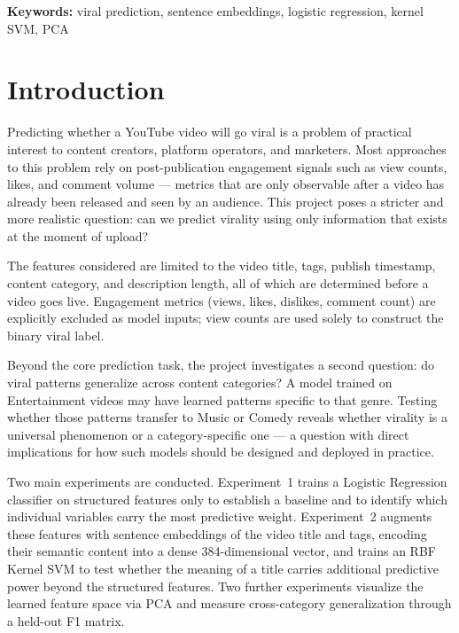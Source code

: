 \documentclass[12pt,a4paper]{article}
\begin{document}
\noindent\textbf{Keywords:} viral prediction, sentence embeddings, logistic regression, kernel SVM, PCA

\vspace{1em}
\newpage
\tableofcontents
\newpage

\section{Introduction}

Predicting whether a YouTube video will go viral is a problem of practical
interest to content creators, platform operators, and marketers.  Most
approaches to this problem rely on post-publication engagement signals such as
view counts, likes, and comment volume --- metrics that are only observable
after a video has already been released and seen by an audience.  This project
poses a stricter and more realistic question: can we predict virality
using only information that exists at the moment of upload?

The features considered are limited to the video title, tags, publish
timestamp, content category, and description length, all of which are
determined before a video goes live.  Engagement metrics (views, likes,
dislikes, comment count) are explicitly excluded as model inputs; view counts
are used solely to construct the binary viral label.

Beyond the core prediction task, the project investigates a second question:
do viral patterns generalize across content categories?  A model
trained on Entertainment videos may have learned patterns specific to that genre.
Testing whether those patterns transfer to Music or Comedy reveals
whether virality is a universal phenomenon or a category-specific one --- a
question with direct implications for how such models should be designed and
deployed in practice.

Two main experiments are conducted.  Experiment~1 trains a Logistic Regression
classifier on structured features only to establish a baseline and to identify
which individual variables carry the most predictive weight.  Experiment~2
augments these features with sentence embeddings of the video title and tags,
encoding their semantic content into a dense 384-dimensional vector, and trains
an RBF Kernel SVM to test whether the meaning of a title carries additional
predictive power beyond the structured features.  Two further experiments
visualize the learned feature space via PCA and measure cross-category
generalization through a held-out F1 matrix.
\end{document}
